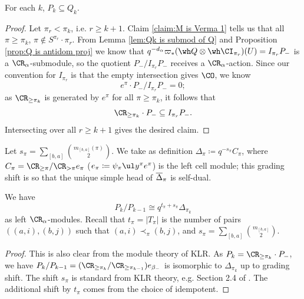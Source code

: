 \documentclass[11pt,reqno]{amsart}
\begin{document}
\begin{claim}\label{claim:M is Verma 2}
    For each $k$, $P_k\subseteq Q_k$. 
\end{claim}
\begin{proof}
    Let $\pi_r<\pi_k$, i.e. $r\ge k+1$. Claim \ref{claim:M is Verma 1} tells us that all $\pi\ge\pi_k$, $\pi\not\in S^{\pi_r}\cdot \pi_r$. From Lemma \ref{lem:Qk is submod of Q} and Proposition \ref{prop:Q is antidom proj} we know that $q^{-d_\alpha}\varpi_*(\wh Q\otimes\wh\CI_{\pi_r})(U)=I_{\pi_r} P_-$ is a $\CR_\alpha$-submodule, so the quotient $P_-/I_{\pi_r}P_-$ receives a $\CR_\alpha$-action. Since our convention for $I_{\pi_r}$ is that the empty intersection gives $\CO$, we know
    \[e^{\pi}\cdot P_-/I_{\pi_r}P_-=0;\] 
    as $\CR_{\ge\pi_k}$ is generated by $e^\pi$ for all $\pi\ge\pi_k$, it follows that
    \[\CR_{\ge\pi_k}\cdot P_-\subseteq I_{\pi_r} P_-.\] 
    Intersecting over all $r\ge k+1$ gives the desired claim.
\end{proof}
Let $s_\pi=\sum_{[b,a]} \binom{m_{[b,a]}(\pi)}{2}$. We take as definition $\Delta_\pi\coloneqq q^{-s_\pi} C_\pi$, where $C_\pi=\CR_{\ge\pi}/\CR_{>\pi} e_\pi$ ($e_\pi\coloneqq \psi_\pi \ul y^\pi e^\pi$) is the left cell module; this grading shift is so that the unique simple head of $\overline{\Delta}_\pi$ is self-dual.
\begin{lemma}
    We have
    \[P_k/P_{k-1}\cong q^{t_\pi+s_\pi}\Delta_{\pi_k}\]
    as left $\CR_\alpha$-modules. Recall that $t_\pi=|T_\pi|$ is the number of pairs $((a,i),(b,j))$ such that $(a,i)\prec_\pi(b,j)$, and $s_\pi=\sum_{[b,a]} \binom{m_{[b,a]}}{2}$.
\end{lemma}
\begin{proof}
    This is also clear from the module theory of KLR. As $P_k=\CR_{\ge\pi_k}\cdot P_-$, we have $P_k/P_{k-1}=(\CR_{\ge\pi_k}/\CR_{\ge \pi_{k-1}})e_{\beta_-}$ is isomorphic to $\Delta_{\pi_k}$ up to grading shift. The shift $s_\pi$ is standard from KLR theory, e.g. Section 2.4 of \cite{kleshchev2013affine}. The additional shift by $t_\pi$ comes from the choice of idempotent.
    
\end{proof}
\end{document}
